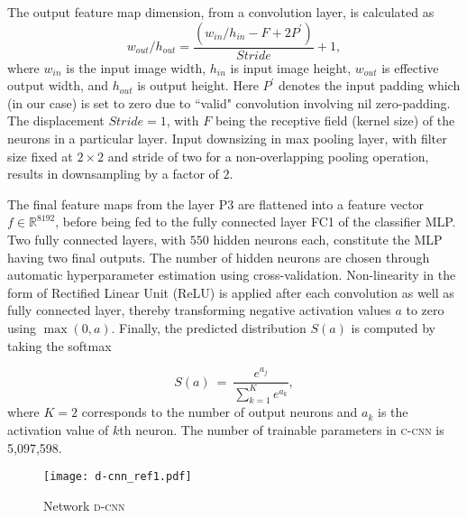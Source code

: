 \documentclass[journal,twocolumn]{IEEEtran}
\begin{document}
The output feature map dimension, from a convolution layer, is  calculated as
\begin{equation}
w_{out}/h_{out} = \frac{(w_{in}/h_{in} - F + 2P^{\prime})}{Stride} + 1,
	\label{eq:getSize}
\end{equation}where $w_{in}$ is the input image width, $h_{in}$ is input image height, $w_{out}$ is effective output width, and $h_{out}$ is output height. Here $P^{\prime}$ denotes  the input padding which (in our case) is set to zero due to ``valid" convolution  involving nil  zero-padding. The displacement   $Stride=1$, with $F$ being the receptive field  (kernel size) of the neurons in a particular layer.
Input downsizing  in max pooling layer, with filter size fixed at  $2 \times 2$ and stride of two for a non-overlapping pooling operation,  results in  downsampling  by a factor of $2$.

The final feature maps from the layer P3 are  flattened into a feature vector $f \in \mathbb{R}^{8192}$, before being fed to the fully connected  layer FC1 of the classifier MLP.
Two fully connected layers, with $550$   hidden neurons each, constitute the MLP having two final outputs.  The number of hidden neurons are chosen through automatic hyperparameter estimation using cross-validation. Non-linearity in the form of Rectified Linear Unit (ReLU) \cite{Nair2010_relu}  is applied after each convolution as well as  fully connected layer, thereby  transforming negative activation values $a$  to zero using $\max(0, a)$. Finally, the predicted distribution $S(a)$ is computed by taking the softmax

\begin{equation}
 S(a)\:=\:\frac{e^{a_j}}{\sum^{K}_{k=1}e^{a_k}},
\end{equation} where $K = 2$  corresponds to the number of output neurons  and $a_{k}$ is the  activation value of  $k$th neuron. The number of trainable parameters in {\scshape{c-cnn}} is 5,097,598.

\begin{figure*}
\begin{center}
	\texttt{[image: d-cnn\_ref1.pdf]}
	\caption{Network {\scshape{d-cnn}}}
	\label{fig:d-cnn}
\end{center}
\end{figure*}
\end{document}

